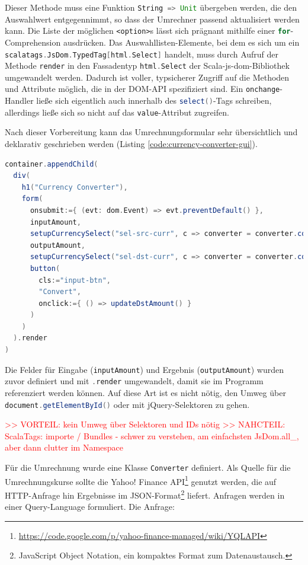 \documentclass[a4paper, 12pt, hidelinks, listof=totoc, listoftables=totoc, bibliography=totoc]{scrreprt}
\newcommand{\scala}[1]{\lstinline[language=Scala, style=inline]|#1|}
\newcommand{\html}[1]{\lstinline[language=HTML5, style=inline]|#1|}
\newcommand{\TODO}[1]{\textcolor{red}{#1}\newline}
\begin{document}
Dieser Methode muss eine Funktion \scala{String => Unit} übergeben werden, die den Auswahlwert entgegennimmt, so dass der Umrechner passend aktualisiert werden kann. Die Liste der möglichen \html{<option>}s lässt sich prägnant mithilfe einer \scala{for}-Comprehension ausdrücken. Das Auswahllisten-Elemente, bei dem es sich um ein \scala{scalatags.JsDom.TypedTag[html.Select]} handelt, muss durch Aufruf der Methode \scala{render} in den Fassadentyp \scala{html.Select} der Scala-js-dom-Bibliothek umgewandelt werden. Dadurch ist voller, typsicherer Zugriff auf die Methoden und Attribute möglich, die in der \ac{DOM}-\ac{API} spezifiziert sind. Ein \scala{onchange}-Handler ließe sich eigentlich auch innerhalb des \scala{select()}-Tags schreiben, allerdings ließe sich so nicht auf das \scala{value}-Attribut zugreifen.

Nach dieser Vorbereitung kann das Umrechnungsformular sehr übersichtlich und deklarativ geschrieben werden (Listing \ref{code:currency-converter-gui}).

\begin{lstlisting}[language=Scala, caption={Deklaration eines Formulars zur Währungsumrechnung mit ScalaTags.}, label={code:currency-converter-gui}]
container.appendChild(
  div(
    h1("Currency Converter"),
    form(
      onsubmit:={ (evt: dom.Event) => evt.preventDefault() },
      inputAmount,
      setupCurrencySelect("sel-src-curr", c => converter = converter.copy(srcCurr = c)),
      outputAmount,
      setupCurrencySelect("sel-dst-curr", c => converter = converter.copy(dstCurr = c)),
      button(
        cls:="input-btn",
        "Convert",
        onclick:={ () => updateDstAmount() }
      )
    )
  ).render
)
\end{lstlisting}

Die Felder für Eingabe (\scala{inputAmount}) und Ergebnis (\scala{outputAmount}) wurden zuvor definiert und mit \scala{.render} umgewandelt, damit sie im Programm referenziert werden können. Auf diese Art ist es nicht nötig, den Umweg über \scala{document.getElementById()} oder mit jQuery-Selektoren zu gehen.

\TODO{>> VORTEIL: kein Umweg über Selektoren und IDs nötig}
\TODO{>> NAHCTEIL: ScalaTags: importe / Bundles - schwer zu verstehen, am einfachsten JsDom.all\_, aber dann clutter im Namespace}

Für die Umrechnung wurde eine Klasse \scala{Converter} definiert. Als Quelle für die Umrechnungskurse sollte die Yahoo! Finance \ac{API}\footnote{\url{https://code.google.com/p/yahoo-finance-managed/wiki/YQLAPI}} genutzt werden, die auf HTTP-Anfrage hin Ergebnisse im JSON-Format\footnote{JavaScript Object Notation, ein kompaktes Format zum Datenaustausch.} liefert. Anfragen werden in einer Query-Language formuliert. Die Anfrage:
\end{document}
